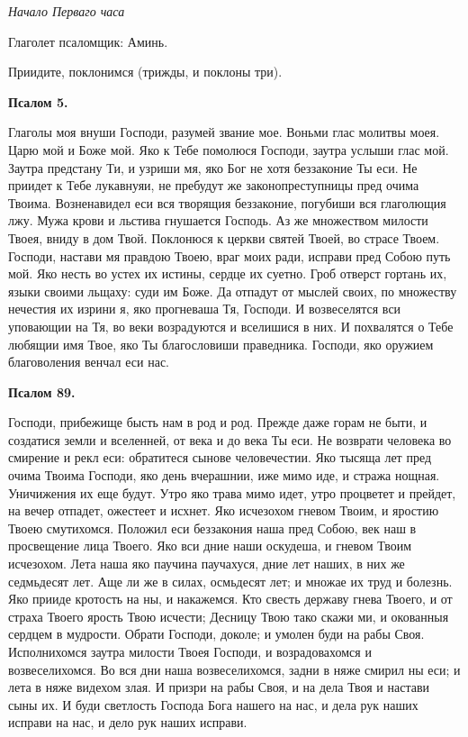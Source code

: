 \itshape Начало Перваго часа 


Глаголет псаломщик:\normalfont{} Аминь.

Приидите, поклонимся (трижды, и поклоны три).


\medskip


\bfseries Псалом 5.\normalfont{}\nopagebreak


Глаголы моя внуши Господи, разумей звание мое. Воньми глас молитвы моея. Царю мой и Боже мой. Яко к Тебе помолюся Господи, заутра услыши глас мой. Заутра предстану Ти, и узриши мя, яко Бог не хотя беззаконие Ты еси. Не приидет к Тебе лукавнуяи, не пребудут же законопреступницы пред очима Твоима. Возненавидел еси вся творящия беззаконие, погубиши вся глаголющия лжу. Мужа крови и льстива гнушается Господь. Аз же множеством милости Твоея, вниду в дом Твой. Поклонюся к церкви святей Твоей, во страсе Твоем. Господи, настави мя правдою Твоею, враг моих ради, исправи пред Собою путь мой. Яко несть во устех их истины, сердце их суетно. Гроб отверст гортань их, языки своими льщаху: суди им Боже. Да отпадут от мыслей своих, по множеству нечестия их изрини я, яко прогневаша Тя, Господи. И возвеселятся вси уповающии на Тя, во веки возрадуются и вселишися в них. И похвалятся о Тебе любящии имя Твое, яко Ты благословиши праведника. Господи, яко оружием благоволения венчал еси нас.


\medskip


\bfseries Псалом 89.\normalfont{}\nopagebreak


Господи, прибежище бысть нам в род и род. Прежде даже горам не быти, и создатися земли и вселенней, от века и до века Ты еси. Не возврати человека во смирение и рекл еси: обратитеся сынове человечестии. Яко тысяща лет пред очима Твоима Господи, яко день вчерашнии, иже мимо иде, и стража нощная. Уничижения их еще будут. Утро яко трава мимо идет, утро процветет и прейдет, на вечер отпадет, ожестеет и исхнет. Яко исчезохом гневом Твоим, и яростию Твоею смутихомся. Положил еси беззакония наша пред Собою, век наш в просвещение лица Твоего. Яко вси дние наши оскудеша, и гневом Твоим исчезохом. Лета наша яко паучина паучахуся, дние лет наших, в них же седмьдесят лет. Аще ли же в силах, осмьдесят лет; и множае их труд и болезнь. Яко прииде кротость на ны, и накажемся. Кто свесть державу гнева Твоего, и от страха Твоего ярость Твою исчести; Десницу Твою тако скажи ми, и окованныя сердцем в мудрости. Обрати Господи, доколе; и умолен буди на рабы Своя. Исполнихомся заутра милости Твоея Господи, и возрадовахомся и возвеселихомся. Во вся дни наша возвеселихомся, задни в няже смирил ны еси; и лета в няже видехом злая. И призри на рабы Своя, и на дела Твоя и настави сыны их. И буди светлость Господа Бога нашего на нас, и дела рук наших исправи на нас, и дело рук наших исправи.


